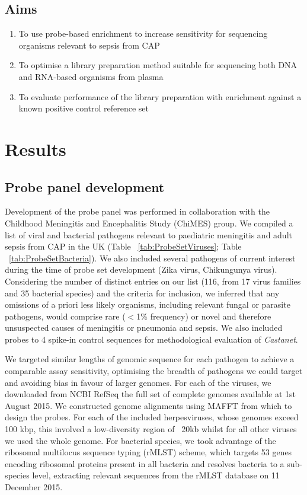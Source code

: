 \subsection{Aims}

\begin{enumerate}
	\item To use probe-based enrichment to increase sensitivity for sequencing organisms relevant to sepsis from CAP
	\item To optimise a library preparation method suitable for sequencing both DNA and RNA-based organisms from plasma
	\item To evaluate performance of the library preparation with enrichment against a known positive control reference set
\end{enumerate}

\section{Results}

\subsection{Probe panel development}
Development of the probe panel was performed in collaboration with the Childhood Meningitis and Encephalitis Study (ChiMES) group. We compiled a list of viral and bacterial pathogens relevant to paediatric meningitis and adult sepsis from CAP in the UK (Table ~\ref{tab:ProbeSetViruses}; Table ~\ref{tab:ProbeSetBacteria}). We also included several pathogens of current interest during the time of probe set development (Zika virus, Chikungunya virus). Considering the number of distinct entries on our list (116, from 17 virus families and 35 bacterial species) and the criteria for inclusion, we inferred that any omissions of a priori less likely organisms, including relevant fungal or parasite pathogens, would comprise rare ($<$1\% frequency) or novel and therefore unsuspected causes of meningitis or pneumonia and sepsis. We also included probes to 4 spike-in control sequences for methodological evaluation of \textit{Castanet}.

We targeted similar lengths of genomic sequence for each pathogen to achieve a comparable assay sensitivity, optimising the breadth of pathogens we could target and avoiding bias in favour of larger genomes. For each of the viruses, we downloaded from NCBI RefSeq the full set of complete genomes available at 1st August 2015. We constructed genome alignments using MAFFT from which to design the probes. For each of the included herpesviruses, whose genomes exceed 100 kbp, this involved a low-diversity region of ~20kb whilst for all other viruses we used the whole genome.  For bacterial species, we took advantage of the ribosomal multilocus sequence typing (rMLST) scheme, which targets 53 genes encoding ribosomal proteins present in all bacteria and resolves bacteria to a sub-species level, extracting relevant sequences from the rMLST database on 11 December 2015. 


